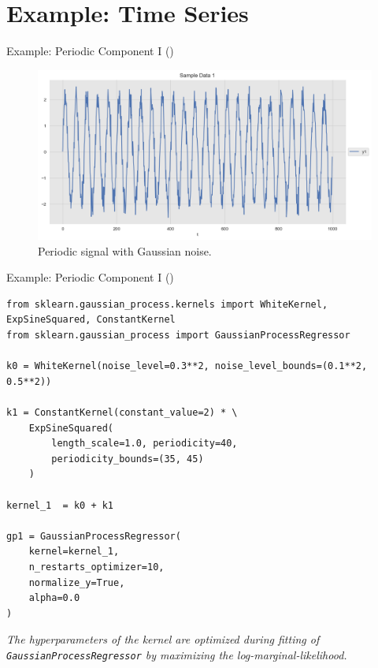 \documentclass[10pt]{beamer}
\begin{document}
\section{Example: Time Series}

\begin{frame}{Example: Periodic Component I (\cite{gaussian_process_time_series_2019})}{\cite[Section 1.7. Gaussian Processes]{scikitlearn}}
\begin{center}
\begin{figure}
\includegraphics[scale=0.4]{images/gaussian_process_time_series_files/gaussian_process_time_series_13_0.png} 
\caption{Periodic signal with Gaussian noise.}
\end{figure}
\end{center}
\end{frame}

\begin{frame}[fragile]{Example: Periodic Component I (\cite{gaussian_process_time_series_2019})}{\cite[Section 1.7. Gaussian Processes]{scikitlearn}}
\begin{lstlisting}
from sklearn.gaussian_process.kernels import WhiteKernel, ExpSineSquared, ConstantKernel
from sklearn.gaussian_process import GaussianProcessRegressor

k0 = WhiteKernel(noise_level=0.3**2, noise_level_bounds=(0.1**2, 0.5**2))

k1 = ConstantKernel(constant_value=2) * \ 
    ExpSineSquared(
        length_scale=1.0, periodicity=40, 
        periodicity_bounds=(35, 45)
    )

kernel_1  = k0 + k1 

gp1 = GaussianProcessRegressor(
    kernel=kernel_1, 
    n_restarts_optimizer=10, 
    normalize_y=True,
    alpha=0.0
)
\end{lstlisting}
{\em The hyperparameters of the kernel are optimized during fitting of \texttt{GaussianProcessRegressor} by maximizing the log-marginal-likelihood.}
\end{frame}
\end{document}

